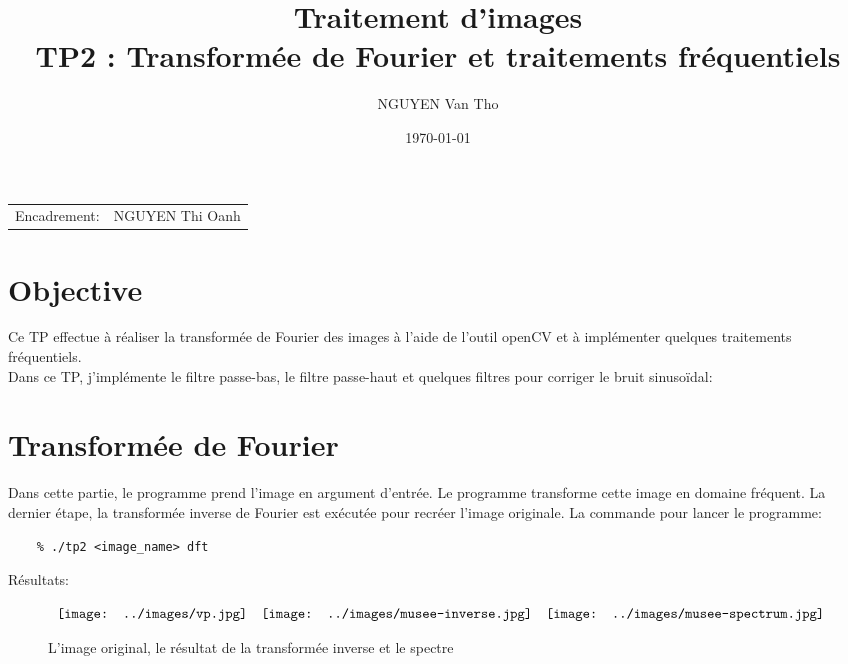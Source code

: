 \documentclass[paper=a4, fontsize=11pt]{scrartcl}	%
\title{ \Huge {Traitement d'images}\\ \Large TP2 : Transformée de Fourier et traitements fréquentiels} %
\author{\textsc{NGUYEN} Van Tho} %
\date{\today} %
\begin{document}
\maketitle %

\begin{center}
\begin{tabular}{l r}
Encadrement: & NGUYEN Thi Oanh %
\end{tabular}
\end{center}



\section{Objective}

Ce TP effectue à réaliser la transformée de Fourier des images à l'aide de l'outil openCV et à implémenter quelques traitements fréquentiels.\\ 
Dans ce TP, j'implémente le filtre passe-bas, le filtre passe-haut et quelques filtres pour corriger le bruit sinusoïdal: 

\section{Transformée de Fourier}
Dans cette partie, le programme prend l'image en argument d'entrée. Le programme transforme cette image en domaine fréquent. La dernier étape, la transformée inverse de Fourier est exécutée pour recréer l'image originale.
La commande pour lancer le programme: 
\begin{lstlisting}
    % ./tp2 <image_name> dft
\end{lstlisting}
Résultats:  
\begin{figure}[h]
	\begin{center}$
		\begin{array}[h]{ccc}
		\texttt{[image: ../images/vp.jpg]}&
		\texttt{[image: ../images/musee-inverse.jpg]}&
		\texttt{[image: ../images/musee-spectrum.jpg]}		
		\end{array}$		
	\end{center}
	\caption{L'image original, le résultat de la transformée inverse et le spectre}
\end{figure}
\end{document}
